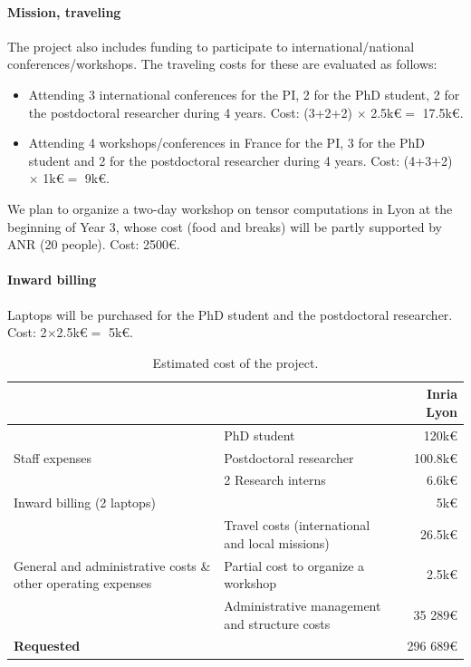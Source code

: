 \documentclass[a4paper,11pt]{article}
\newcommand{\sk}[1]{{\color{blue} \emph{#1}}}
\begin{document}
	
	
	\paragraph{Mission, traveling} The project also includes funding to participate to international/national conferences/workshops. The traveling costs for these are evaluated as follows:
	\begin{itemize}
		\item Attending 3 international conferences for the PI, 2 for the PhD student, 2 for the postdoctoral researcher during 4 years. Cost: (3+2+2) $\times $ 2.5k\euro $=$ 17.5k\euro.
		\item Attending 4 workshops/conferences in France for the PI, 3 for the PhD student and 2 for the postdoctoral researcher during 4 years. Cost: (4+3+2) $\times$ 1k\euro $=$ 9k\euro.
	\end{itemize}
	We plan to organize a two-day workshop on tensor computations in Lyon at the beginning of Year 3, whose cost (food and breaks) will be partly supported by ANR (20 people). Cost: 2500\euro.
	
	\paragraph{Inward billing} Laptops will be purchased for the PhD student and the postdoctoral researcher. Cost: 2$\times$2.5k\euro $=$ 5k\euro.
	
	
	\begin{table}
		\begin{center}
			\begin{tabular}{p{3.8cm}p{8.25cm}r}
				\toprule
				\multicolumn{1}{l}{}&& Inria Lyon \\\midrule
				\multirow{3}{3.8cm}{Staff expenses}  & PhD student &   120k\euro \\\cline{2-3}
				& Postdoctoral researcher  &100.8k\euro \\ \cline{2-3}
				& 2 Research interns  & 6.6k\euro \\\hline
				\multicolumn{2}{p{7cm}}{Inward billing (2 laptops)}    &    5k\euro \\\hline
				\multirow{3}{3.8cm}{General and administrative costs \& other
					operating expenses}  & Travel costs (international and local missions)  &  26.5k\euro \\\cline{2-3}
				& Partial cost to organize a workshop  &  2.5k\euro \\\cline{2-3}
				& Administrative management and\newline
				structure costs& 35 289\euro \\\midrule
				\multicolumn{2}{l}{\bf Requested} &\multicolumn{1}{r}{296 689\euro} \\
				\bottomrule
			\end{tabular}
		\end{center}
		\caption{Estimated cost of the project.}
		\label{tab:costs}
	\end{table}
\end{document}
